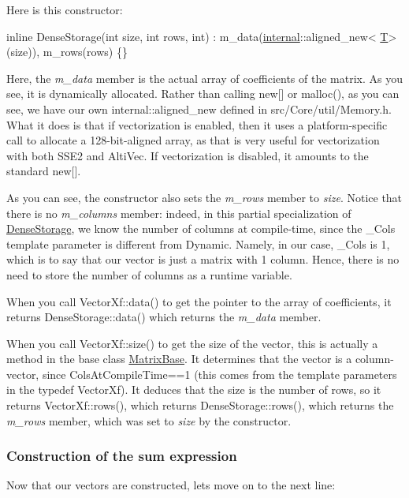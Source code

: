 Here is this constructor\+: 
\begin{DoxyCode}
\textcolor{keyword}{inline} DenseStorage(\textcolor{keywordtype}{int} size, \textcolor{keywordtype}{int} rows, \textcolor{keywordtype}{int}) : m\_data(\hyperlink{namespaceinternal}{internal}::aligned\_new<
      \hyperlink{group___sparse_core___module_class_eigen_1_1_triplet}{T}>(size)), m\_rows(rows) \{\}
\end{DoxyCode}


Here, the {\itshape m\+\_\+data} member is the actual array of coefficients of the matrix. As you see, it is dynamically allocated. Rather than calling new\mbox{[}\mbox{]} or malloc(), as you can see, we have our own internal\+::aligned\+\_\+new defined in src/\+Core/util/\+Memory.\+h. What it does is that if vectorization is enabled, then it uses a platform-\/specific call to allocate a 128-\/bit-\/aligned array, as that is very useful for vectorization with both S\+S\+E2 and Alti\+Vec. If vectorization is disabled, it amounts to the standard new\mbox{[}\mbox{]}.

As you can see, the constructor also sets the {\itshape m\+\_\+rows} member to {\itshape size}. Notice that there is no {\itshape m\+\_\+columns} member\+: indeed, in this partial specialization of \hyperlink{class_eigen_1_1_dense_storage}{Dense\+Storage}, we know the number of columns at compile-\/time, since the \+\_\+\+Cols template parameter is different from Dynamic. Namely, in our case, \+\_\+\+Cols is 1, which is to say that our vector is just a matrix with 1 column. Hence, there is no need to store the number of columns as a runtime variable.

When you call Vector\+Xf\+::data() to get the pointer to the array of coefficients, it returns Dense\+Storage\+::data() which returns the {\itshape m\+\_\+data} member.

When you call Vector\+Xf\+::size() to get the size of the vector, this is actually a method in the base class \hyperlink{group___core___module_class_eigen_1_1_matrix_base}{Matrix\+Base}. It determines that the vector is a column-\/vector, since Cols\+At\+Compile\+Time==1 (this comes from the template parameters in the typedef Vector\+Xf). It deduces that the size is the number of rows, so it returns Vector\+Xf\+::rows(), which returns Dense\+Storage\+::rows(), which returns the {\itshape m\+\_\+rows} member, which was set to {\itshape size} by the constructor.\hypertarget{_topic_inside_eigen_example_ConstructionOfSumXpr}{}\subsubsection{Construction of the sum expression}\label{_topic_inside_eigen_example_ConstructionOfSumXpr}
Now that our vectors are constructed, let\textquotesingle{}s move on to the next line\+:


